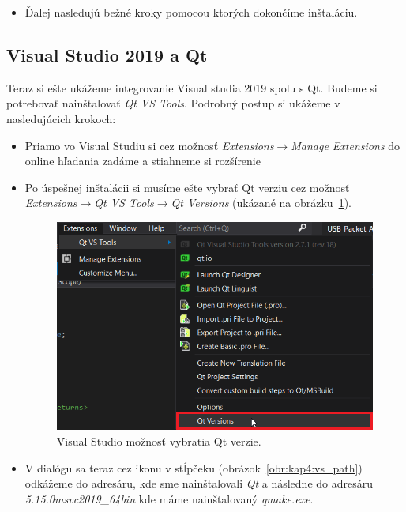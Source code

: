 \begin{itemize}
\item Ďalej nasledujú bežné kroky pomocou ktorých dokončíme inštaláciu.

\end{itemize}

\subsection{Visual Studio 2019 a Qt}
\label{kap4:sec:VS2019_qt}
Teraz si ešte ukážeme integrovanie Visual studia 2019 spolu s Qt. Budeme si potrebovať nainštalovať \textit{Qt VS Tools}. Podrobný postup si ukážeme v nasledujúcich krokoch:
\begin{itemize}
\label{kap4:qt_vs_integ}
\item Priamo vo Visual Studiu si cez možnosť \textit{Extensions}$\rightarrow$\textit{Manage Extensions} do online hľadania zadáme  a stiahneme si rozšírenie ~\cite{qt_vs_tools}
\item\label{kap4:qt_vs_integ:krok2} Po úspešnej inštalácii si musíme ešte vybrať Qt verziu cez možnosť \textit{Extensions}$\rightarrow$\textit{Qt VS Tools}$\rightarrow$\textit{Qt Versions} (ukázané na obrázku~\ref{obr:kap4:vs_versions}).

\begin{figure}[!htb]
	\centering
	\includegraphics[width=12cm]{img/kap04_vs_versions}
	\caption{Visual Studio možnosť vybratia Qt verzie.}
	\label{obr:kap4:vs_versions}
\end{figure}

\item V dialógu sa teraz cez ikonu v stĺpčeku  (obrázok~\ref{obr:kap4:vs_path}) odkážeme do adresáru, kde sme nainštalovali \textit{Qt} a následne do adresáru \newline\textit{5.15.0\/msvc2019\_64\/bin} kde máme nainštalovaný \textit{qmake.exe}.


\end{itemize}
